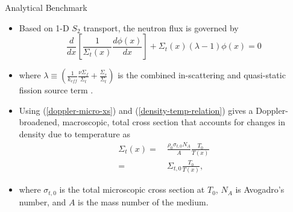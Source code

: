 \documentclass[9pt,t]{beamer}
\begin{document}
\begin{frame}{Analytical Benchmark}
    \pause
    \begin{itemize}
        \item<2-> Based on 1-D $S_{2}$ transport, the neutron flux is governed by
        \begin{equation}
            \frac{d}{dx}\left\lbrack\frac{1}{\Sigma_{t}(x)} \frac{d\phi(x)}{dx} \right\rbrack + \Sigma_{t}(x)
            \left(\lambda - 1\right)\phi(x) = 0
        \end{equation}
        \item<3-> where $\lambda \equiv (\frac{1}{k_{eff}}\frac{\nu \Sigma_{f}}{\Sigma_{t}} + \frac{\Sigma_{s}}{\Sigma_{t}} )$ is
        the combined in-scattering and quasi-static fission source term \cite{analytical-benchmark}.
        \item<4-> Using (\ref{doppler-micro-xs}) and (\ref{density-temp-relation}) gives a Doppler-broadened, macroscopic, total
              cross section that accounts for changes in density due to temperature as
        \begin{equation}\begin{aligned}
            \Sigma_{t}(x) =&\  \frac{\rho_{0}\sigma_{t,0} N_{A}}{A} \frac{T_{0}}{T(x)}\\
            =&\  \Sigma_{t,0}\frac{T_{0}}{T(x)} ,
        \end{aligned}\end{equation}
        \item<5-> where $ \sigma_{t,0}$ is the total microscopic cross section at $T_{0}$, $N_{A}$ is Avogadro's number, and $A$ is the mass number
        of the medium.
    \end{itemize}
\end{frame}
\end{document}

